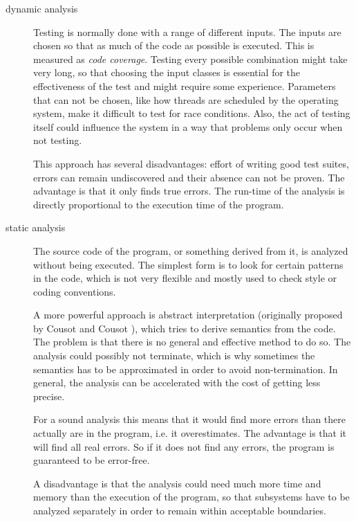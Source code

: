 \begin{description}
 \item[dynamic analysis]
Testing is normally done with a range of different inputs. The inputs are chosen so that as much of the code as possible is executed. This is measured as \textit{code coverage}. Testing every possible combination might take very long, so that choosing the input classes is essential for the effectiveness of the test and might require some experience. Parameters that can not be chosen, like how threads are scheduled by the operating system, make it difficult to test for race conditions. Also, the act of testing itself could influence the system in a way that problems only occur when not testing.

This approach has several disadvantages: effort of writing good test suites, errors can remain undiscovered and their absence can not be proven. The advantage is that it only finds true errors.
The run-time of the analysis is directly proportional to the execution time of the program.

\item[static analysis]
The source code of the program, or something derived from it, is analyzed without being executed.
The simplest form is to look for certain patterns in the code, which is not very flexible and mostly used to check style or coding conventions.

A more powerful approach is abstract interpretation (originally proposed by Cousot and Cousot \cite{Cousot:1977:AIU:512950.512973}), which tries to derive semantics from the code.
The problem is that there is no general and effective method to do so. The analysis could possibly not terminate, which is why sometimes the semantics has to be approximated in order to avoid non-termination. In general, the analysis can be accelerated with the cost of getting less precise.

For a sound analysis this means that it would find more errors than there actually are in the program, i.e. it overestimates. The advantage is that it will find all real errors. So if it does not find any errors, the program is guaranteed to be error-free.

A disadvantage is that the analysis could need much more time and memory than the execution of the program, so that subsystems have to be analyzed separately in order to remain within acceptable boundaries.
\end{description}


